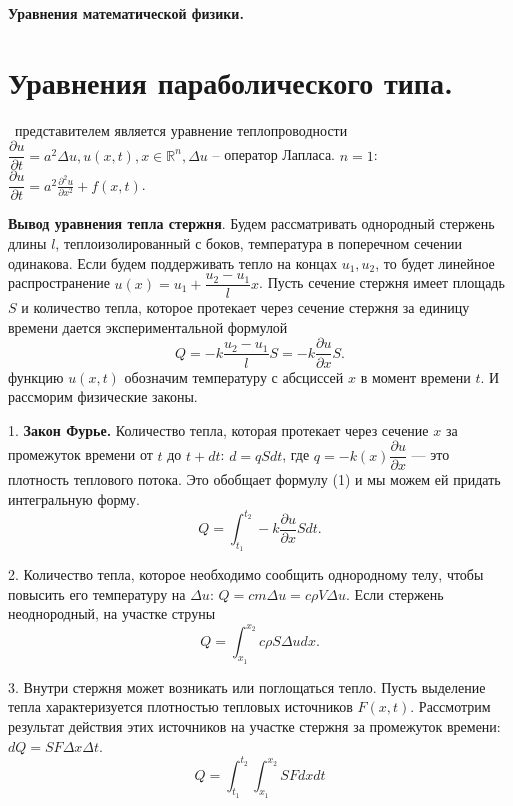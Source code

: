 \documentclass[9pt]{article}
\begin{document}
\begin{center}
    \huge\textbf{Уравнения математической физики.}
\end{center}

\section{Уравнения параболического типа.}

\ 
 представителем является уравнение теплопроводности \(\dfrac{\partial u}{\partial t}=a^2\Delta u, u(x,t), x\in \mathbb{R}^n,\Delta u\) -- оператор Лапласа.
\parПри \(n=1\): \(\dfrac{\partial u}{\partial t}=a^2\frac{\partial^2u}{\partial x^2}+f(x,t)\).
\par\textbf{Вывод уравнения тепла стержня}. Будем рассматривать однородный стержень длины \(l\), теплоизолированный с боков, температура в поперечном сечении одинакова. Если будем поддерживать тепло на концах \(u_1,u_2\), то будет линейное распространение \(u(x)=u_1+\dfrac{u_2-u_1}{l}x\). Пусть сечение стержня имеет площадь \(S\) и количество тепла, которое протекает через сечение стержня за единицу времени дается экспериментальной формулой
\begin{equation}
    Q=-k\dfrac{u_2-u_1}{l}S=-k\dfrac{\partial u}{\partial x}S.
\end{equation}
 функцию \(u(x,t)\) обозначим температуру с абсциссей \(x\) в момент времени \(t\). И рассморим физические законы.
\par1. \textbf{Закон Фурье.} Количество тепла, которая протекает через сечение \(x\) за промежуток времени от \(t\) до \(t+dt\): \(d=qSdt\), где \(q=-k(x)\dfrac{\partial u}{\partial x}\) --- это плотность теплового потока. Это обобщает формулу (1) и мы можем ей придать интегральную форму.
\begin{equation}
    Q=\int_{t_1}^{t_2}-k\dfrac{\partial u}{\partial x}Sdt.
\end{equation}
\par2. Количество тепла, которое необходимо сообщить однородному телу, чтобы повысить его температуру на \(\Delta u\): \(Q=cm\Delta u=c\rho V\Delta u\). Если стержень неоднородный, на участке струны
\begin{equation}
    Q=\int_{x_1}^{x_2}c\rho S\Delta udx.
\end{equation}
\par3. Внутри стержня может возникать или поглощаться тепло. Пусть выделение тепла характеризуется плотностью тепловых источников \(F(x,t)\). Рассмотрим результат действия этих источников на участке стержня за промежуток времени: \(dQ=SF\Delta x\Delta t\).
\begin{equation}
    Q=\int_{t_1}^{t_2}\int_{x_1}^{x_2}SFdxdt
\end{equation}
\end{document}
